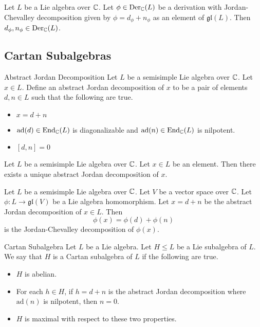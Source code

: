 \documentclass[a4paper]{article}
\begin{document}
\begin{lmm}{}{} Let $L$ be a Lie algebra over $\mathbb{C}$. Let $\phi\in\text{Der}_{\mathbb{C}}(L)$ be a derivation with Jordan-Chevalley decomposition given by $\phi=d_\phi+n_\phi$ as an element of $\mathfrak{gl}(L)$. Then $d_\phi,n_\phi\in\text{Der}_{\mathbb{C}}(L)$. 
\end{lmm}

\subsection{Cartan Subalgebras}
\begin{defn}{Abstract Jordan Decomposition}{} Let $L$ be a semisimple Lie algebra over $\mathbb{C}$. Let $x\in L$. Define an abstract Jordan decomposition of $x$ to be a pair of elements $d,n\in L$ such that the following are true. 
\begin{itemize}
\item $x=d+n$
\item $\text{ad}(d)\in\text{End}_{\mathbb{C}}(L)$ is diagonalizable and $\text{ad}(n)\in\text{End}_{\mathbb{C}}(L)$ is nilpotent. 
\item $[d,n]=0$
\end{itemize}
\end{defn}

\begin{crl}{}{} Let $L$ be a semisimple Lie algebra over $\mathbb{C}$. Let $x\in L$ be an element. Then there exists a unique abstract Jordan decomposition of $x$. 
\end{crl}

\begin{prp}{}{} Let $L$ be a semisimple Lie algebra over $\mathbb{C}$. Let $V$ be a vector space over $\mathbb{C}$. Let $\phi:L\to\mathfrak{gl}(V)$ be a Lie algebra homomorphism. Let $x=d+n$ be the abstract Jordan decomposition of $x\in L$. Then $$\phi(x)=\phi(d)+\phi(n)$$ is the Jordan-Chevalley decomposition of $\phi(x)$. 
\end{prp}

\begin{defn}{Cartan Subalgebra}{} Let $L$ be a Lie algebra. Let $H\leq L$ be a Lie subalgebra of $L$. We say that $H$ is a Cartan subalgebra of $L$ if the following are true. 
\begin{itemize}
\item $H$ is abelian. 
\item For each $h\in H$, if $h=d+n$ is the abstract Jordan decomposition where $\text{ad}(n)$ is nilpotent, then $n=0$. 
\item $H$ is maximal with respect to these two properties. 
\end{itemize}
\end{defn}
\end{document}
